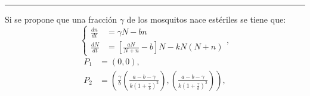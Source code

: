 \documentclass[twocolumn,aps,prl]{revtex4-1}
\newcommand*\sepline{%
  \begin{center}
    \rule[1ex]{.5\textwidth}{.5pt}
  \end{center}}
\newcommand{\tusa}{ \frac{a-b-\gamma}{k(1+\frac{\gamma}{b})^2} }
\begin{document}

\sepline

Si se propone que una fracción $\gamma$ de los mosquitos nace estériles se tiene que:
\begin{equation}
    \left\lbrace
    \begin{aligned}
        \frac{d n}{d t}&=  \gamma N - b n
        \\
        \frac{d N}{d t}&=\left[\frac{a N}{N+n}-b\right] N- k N(N+n) 
    \end{aligned}
    \right. ,
\end{equation}
$$
\begin{aligned}
    P_1 &= (0, 0) ,\\
    P_2 &= \left( \frac{\gamma}{b} \left( \tusa \right), \left( \tusa \right) \right), \\ 
\end{aligned}
$$
\end{document}
